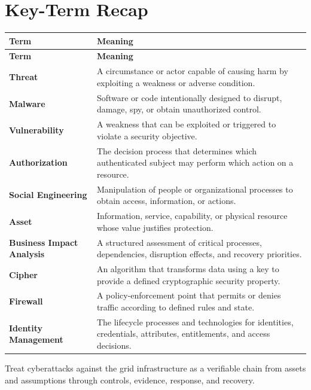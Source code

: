 \documentclass[11pt]{article}
\begin{document}
\section*{Key-Term Recap}
\begin{longtable}{>{\RaggedRight\arraybackslash}p{}>{\RaggedRight\arraybackslash}p{}}
\toprule\rowcolor{Navy}\color{white}\textbf{Term} & \color{white}\textbf{Meaning}\\\midrule
\endfirsthead
\toprule\rowcolor{Navy}\color{white}\textbf{Term} & \color{white}\textbf{Meaning}\\\midrule
\endhead
\textbf{Threat} & A circumstance or actor capable of causing harm by exploiting a weakness or adverse condition. \\\midrule
\textbf{Malware} & Software or code intentionally designed to disrupt, damage, spy, or obtain unauthorized control. \\\midrule
\textbf{Vulnerability} & A weakness that can be exploited or triggered to violate a security objective. \\\midrule
\textbf{Authorization} & The decision process that determines which authenticated subject may perform which action on a resource. \\\midrule
\textbf{Social Engineering} & Manipulation of people or organizational processes to obtain access, information, or actions. \\\midrule
\textbf{Asset} & Information, service, capability, or physical resource whose value justifies protection. \\\midrule
\textbf{Business Impact Analysis} & A structured assessment of critical processes, dependencies, disruption effects, and recovery priorities. \\\midrule
\textbf{Cipher} & An algorithm that transforms data using a key to provide a defined cryptographic security property. \\\midrule
\textbf{Firewall} & A policy-enforcement point that permits or denies traffic according to defined rules and state. \\\midrule
\textbf{Identity Management} & The lifecycle processes and technologies for identities, credentials, attributes, entitlements, and access decisions. \\\midrule
\bottomrule
\end{longtable}
\begin{takeawaybox}
Treat cyberattacks against the grid infrastructure as a verifiable chain from assets and assumptions through controls, evidence, response, and recovery.
\end{takeawaybox}
\end{document}
